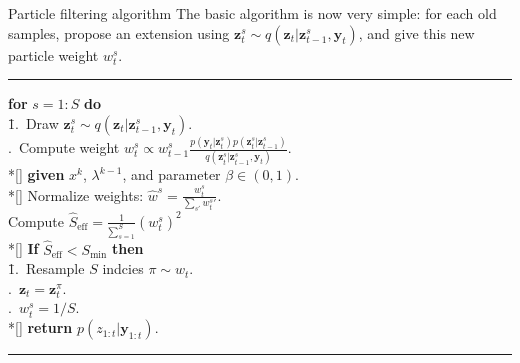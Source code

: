 \documentclass[10pt,mathserif]{beamer}
\begin{document}
\begin{frame}{Particle filtering algorithm}
The basic algorithm is now very simple: for each old samples, propose an extension using $\bm{z}_t^s \sim q(\bm{z}_t|\bm{z}_{t-1}^s, \bm{y}_t)$, and give this new particle weight $w_t^s$.

\noindent\rule[-5pt]{\textwidth}{0.4pt}
{\footnotesize
\begin{tabbing}
    {\bf for} $s=1:S$ {\bf do}\\
    \qquad \= 1.\ Draw $\bm{z}_t^s \sim q(\bm{z}_t|\bm{z}_{t-1}^s, \bm{y}_t)$. \\
    .\ Compute weight $w_t^s \propto w_{t-1}^s\frac{p(\bm{y}_t|\bm{z}_t^s)p(\bm{z}_t^s |\bm{z}_{t-1}^s)}{q(\bm{z}_t^s |\bm{z}_{t-1}^s, \bm{y}_{t})}$.\\*[\smallskipamount]
    {\bf given} $x^k$, $\lambda^{k-1}$, and parameter $\beta \in (0,1)$. \\*[\smallskipamount]
    Normalize weights: ${\hat{w}}^s = \frac{w_t^s}{\sum_{s'}{w_t^s}'}$.\\
    Compute $\hat{S}_{\text{eff}} = \frac{1}{\sum_{s=1}^S}(w_t^s)^2$\\*[\smallskipamount]
    {\bf If} $\hat{S}_{\text{eff}}<S_{\text{min}}$ {\bf then}\\
    \qquad \= 1.\ Resample $S$ indcies $\pi\sim w_t$. \\
    .\ $\bm{z}_t = \bm{z}_t^{\pi}$. \\
    .\ $w_t^s = 1/S$. \\*[\smallskipamount]
    {\bf return} $p(z_{1:t}|\bm{y}_{1:t})$.
\end{tabbing}}
\noindent\rule[10pt]{\textwidth}{0.4pt}
\end{frame}
\end{document}
